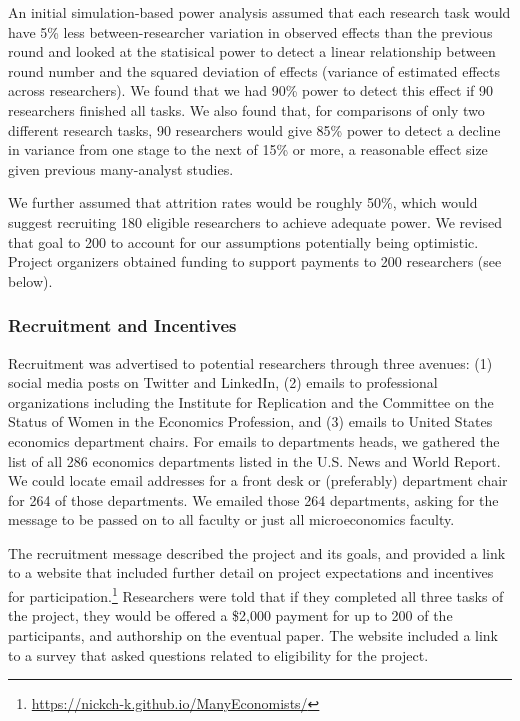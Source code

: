 \documentclass[
  letterpaper,
  DIV=11,
  numbers=noendperiod]{scrartcl}
\begin{document}
An initial simulation-based power analysis assumed that each research
task would have 5\% less between-researcher variation in observed
effects than the previous round and looked at the statisical power to
detect a linear relationship between round number and the squared
deviation of effects (variance of estimated effects across researchers).
We found that we had 90\% power to detect this effect if 90 researchers
finished all tasks. We also found that, for comparisons of only two
different research tasks, 90 researchers would give 85\% power to detect
a decline in variance from one stage to the next of 15\% or more, a
reasonable effect size given previous many-analyst studies.

We further assumed that attrition rates would be roughly 50\%, which
would suggest recruiting 180 eligible researchers to achieve adequate
power. We revised that goal to 200 to account for our assumptions
potentially being optimistic. Project organizers obtained funding to
support payments to 200 researchers (see below).

\hypertarget{recruitment-and-incentives}{%
\subsubsection{Recruitment and
Incentives}\label{recruitment-and-incentives}}

Recruitment was advertised to potential researchers through three
avenues: (1) social media posts on Twitter and LinkedIn, (2) emails to
professional organizations including the Institute for Replication and
the Committee on the Status of Women in the Economics Profession, and
(3) emails to United States economics department chairs. For emails to
departments heads, we gathered the list of all 286 economics departments
listed in the U.S. News and World Report. We could locate email
addresses for a front desk or (preferably) department chair for 264 of
those departments. We emailed those 264 departments, asking for the
message to be passed on to all faculty or just all microeconomics
faculty.

The recruitment message described the project and its goals, and
provided a link to a website that included further detail on project
expectations and incentives for participation.\footnote{\url{https://nickch-k.github.io/ManyEconomists/}}
Researchers were told that if they completed all three tasks of the
project, they would be offered a \$2,000 payment for up to 200 of the
participants, and authorship on the eventual paper. The website included
a link to a survey that asked questions related to eligibility for the
project.
\end{document}
